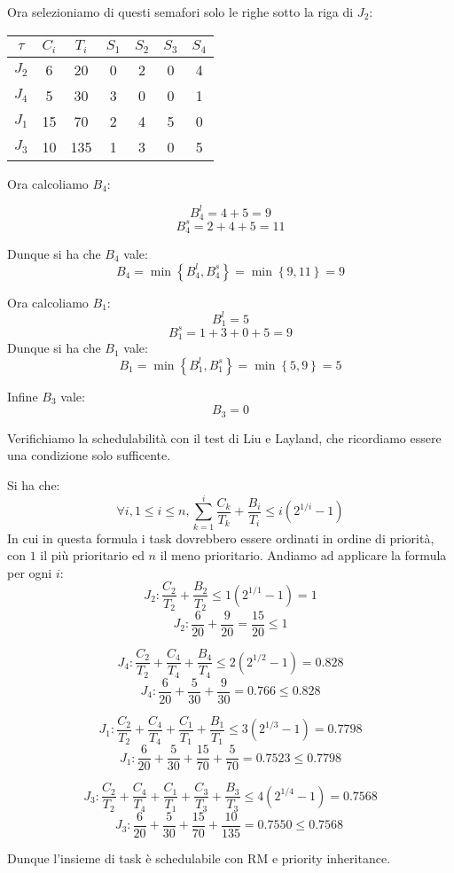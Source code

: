\begin{Esercizio1}
Ora selezioniamo di questi semafori solo le righe sotto la riga di \(J_{2}\):


\begin{table}[H]
\centering
\begin{tabular}{|c|c|c|c|c|c|c|}
\hline
\(\tau\) & $C_i$ & $T_i$ & $S_1$ &  \cellcolor{blue!20} $S_2$ & $S_3$ & \cellcolor{blue!20} $S_4$ \\
\hline
$J_2$ & 6 & 20 & 0 & 2 & 0 & 4 \\

\arrayrulecolor{red}\hline
\arrayrulecolor{black}

$J_4$ & 5 & 30 & 3 & 0 & 0 & 1 \\
\hline
$J_1$ & 15 & 70 & 2 & 4 & 5 & 0 \\
\hline
$J_3$ & 10 & 135 & 1 & 3 & 0 & 5 \\
\hline
\end{tabular}
\label{tab:task_periodici}
\end{table}


Ora calcoliamo \(B_{4}\):

\[B_{4}^{l} = 4 + 5 = 9 \]
\[B_{4}^{s} = 2 +4 +5= 11 \]

Dunque si ha che \(B_{4}\) vale:
\[ B_{4} = \min \left\{B_{4}^{l} , B_{4}^{s}\right\} =
 \min \left\{9 , 11\right\} = 9 \]

 Ora calcoliamo \(B_{1}\):
\[B_{1}^{l} = 5\]
\[B_{1}^{s} = 1 + 3 + 0 +5 = 9 \]
Dunque si ha che \(B_{1}\) vale:
\[ B_{1} = \min \left\{B_{1}^{l} , B_{1}^{s}\right\} =
 \min \left\{5 , 9\right\} = 5 \]

Infine \(B_{3}\) vale:
\[B_{3} = 0\]

Verifichiamo la schedulabilità con il test di Liu e Layland, che ricordiamo essere una condizione
solo sufficente.

Si ha che:
\[ \forall i, 1 \le i \le n, \sum_{k=1}^{i} \frac{C_{k}}{T_{k}} 
+ \frac{B_{i}}{T_{i}} \leq  i (2^{1/i} - 1) \]
In cui in questa formula i task dovrebbero essere ordinati in ordine di priorità,
con \(1\) il più prioritario ed \( n \) il meno prioritario.
Andiamo ad applicare la formula per ogni \(i\):
\[ J_{2} : \frac{C_{2}}{T_{2}} + \frac{B_{2}}{T_{2}} \leq 1 (2^{1/1} - 1) = 1 \]
\[J_{2} : \frac{6}{20} + \frac{9}{20} = \frac{15}{20}\leq 1 \]


\[ J_{4} : \frac{C_{2}}{T_{2}} + \frac{C_{4}}{T_{4}} + \frac{B_{4}}{T_{4}} \leq 2 (2^{1/2} - 1) = 0.828 \]
\[ J_{4} : \frac{6}{20} + \frac{5}{30} + \frac{9}{30} = 0.766 \leq  0.828 \]

\[ J_{1} : \frac{C_{2}}{T_{2}} + \frac{C_{4}}{T_{4}} + 
\frac{C_{1}}{T_{1}} + \frac{B_{1}}{T_{1}} \leq 3 (2^{1/3} - 1) = 0.7798 \]
\[ J_{1} : \frac{6}{20} + \frac{5}{30} + \frac{15}{70} + \frac{5}{70} = 0.7523 \leq 0.7798 \]


\[J_{3} : \frac{C_{2}}{T_{2}} + \frac{C_{4}}{T_{4}} + 
\frac{C_{1}}{T_{1}} +
 \frac{C_{3}}{T_{3}} + \frac{B_{3}}{T_{3}} \leq 4 (2^{1/4} - 1) = 0.7568 \]
\[J_{3} : \frac{6}{20} + \frac{5}{30} + \frac{15}{70} + 
\frac{10}{135} = 0.7550 \leq 0.7568 \
 \]

 Dunque l'insieme di task è schedulabile con RM e priority inheritance.

\end{Esercizio1}


